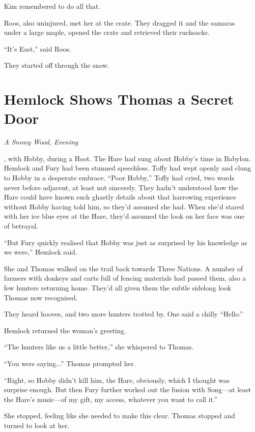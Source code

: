 \documentclass[11pt,a5paper]{article}
\newcommand{\alet}[1]{\textit{#1}\vspace{1em}}
\begin{document}
Kim remembered to do all that.

Roos, also uninjured, met her at the crate. They dragged it and the samaras under a large maple, opened the crate and retrieved their rucksacks.

``It's East,'' said Roos.

They started off through the snow.

\newpage

\section{Hemlock Shows Thomas a Secret Door}

\alet{A Snowy Wood, Evening}

, with Hobby, during a Hoot. The Hare had sung about Hobby's time in Babylon. Hemlock and Fury had been stunned speechless. Toffy had wept openly and clung to Hobby in a desperate embrace. ``Poor Hobby,'' Toffy had cried, two words never before adjacent, at least not sincerely. They hadn't understood how the Hare could have known such ghastly details about that harrowing experience without Hobby having told him, so they'd assumed she had. When she'd stared with her ice blue eyes at the Hare, they'd assumed the look on her face was one of betrayal.

``But Fury quickly realised that Hobby was just as surprised by his knowledge as we were,'' Hemlock said.

She and Thomas walked on the trail back towards Three Nations. A number of farmers with donkeys and carts full of fencing materials had passed them, also a few hunters returning home. They'd all given them the subtle sidelong look Thomas now recognised.

They heard hooves, and two more hunters trotted by. One said a chilly ``Hello.''

Hemlock returned the woman's greeting.

``The hunters like us a little better,'' she whispered to Thomas.

``You were saying...'' Thomas prompted her.

``Right, so Hobby didn't kill him, the Hare, obviously, which I thought was surprise enough. But then Fury further worked out the fusion with Song---at least the Hare's music---of my gift, my access, whatever you want to call it.''

She stopped, feeling like she needed to make this clear. Thomas stopped and turned to look at her.
\end{document}
